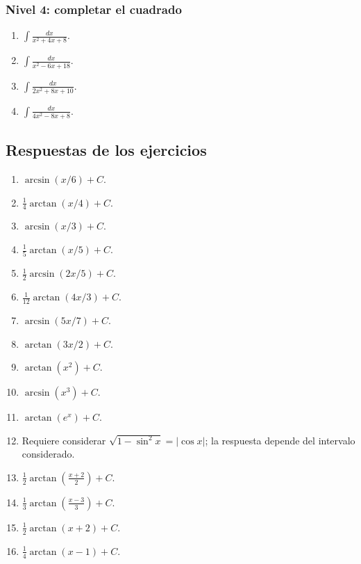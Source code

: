 \documentclass[12pt]{article}
\theoremstyle{definition}
\theoremstyle{remark}
\begin{document}
\subsubsection*{Nivel 4: completar el cuadrado}
\begin{enumerate}[label=\arabic*.,resume]
\item $\displaystyle \int\frac{dx}{x^2+4x+8}$.
\item $\displaystyle \int\frac{dx}{x^2-6x+18}$.
\item $\displaystyle \int\frac{dx}{2x^2+8x+10}$.
\item $\displaystyle \int\frac{dx}{4x^2-8x+8}$.
\end{enumerate}

\subsection{Respuestas de los ejercicios}

\begin{enumerate}[label=\arabic*.]
\item $\displaystyle \arcsin(x/6)+C$.
\item $\displaystyle \frac14\arctan(x/4)+C$.
\item $\displaystyle \arcsin(x/3)+C$.
\item $\displaystyle \frac15\arctan(x/5)+C$.
\item $\displaystyle \frac12\arcsin(2x/5)+C$.
\item $\displaystyle \frac1{12}\arctan(4x/3)+C$.
\item $\displaystyle \arcsin(5x/7)+C$.
\item $\displaystyle \arctan(3x/2)+C$.
\item $\displaystyle \arctan(x^2)+C$.
\item $\displaystyle \arcsin(x^3)+C$.
\item $\displaystyle \arctan(e^x)+C$.
\item Requiere considerar $\sqrt{1-\sin^2x}=|\cos x|$; la respuesta depende del intervalo considerado.
\item $\displaystyle \frac12\arctan\left(\frac{x+2}{2}\right)+C$.
\item $\displaystyle \frac13\arctan\left(\frac{x-3}{3}\right)+C$.
\item $\displaystyle \frac12\arctan(x+2)+C$.
\item $\displaystyle \frac14\arctan(x-1)+C$.
\end{enumerate}
\end{document}

